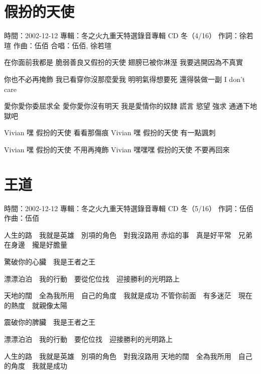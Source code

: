 \documentclass[UTF8,a4paper,oneside,twocolumn,12pt]{ctexbook}
\newcommand{\infopair}[2]{\textbullet #1：#2}
\newcommand{\zc}[1][伍佰]{\infopair{作詞}{#1}}
\newcommand{\zq}[1][伍佰]{\infopair{作曲}{#1}}
\newcommand{\zj}[1]{\infopair{專輯}{#1}}
\newcommand{\sj}[1]{\infopair{時間}{#1}}
\newenvironment{info}{\begin{flushleft}\kaishu
	}
	{\end{flushleft}\normalsize\yahei\par}
\newenvironment{lyric}{
	}
{}
\begin{document}
\section{假扮的天使}
\begin{info}
	\sj{2002-12-12}
	\zj{冬之火九重天特選錄音專輯 CD 冬（4/16）}
	\zc[徐若瑄]
	\zq
	\infopair{合唱}{伍佰, 徐若瑄}
\end{info}
\begin{lyric}
	在你面前我都是
	脆弱善良又假扮的天使
	翅膀已被你淋溼
	我要逃開因為不真實

	你也不必再掩飾
	我已看穿你沒那麼愛我
	明明氣得想要死
	還得裝做一副
	I don't care

	愛你愛你委屈求全
	愛你愛你沒有明天
	我是愛情你的奴隸
	謊言 慾望 強求
	通通下地獄吧

	Vivian 嘿
	假扮的天使 看看那傷痕
	Vivian 嘿
	假扮的天使 有一點諷刺

	Vivian 嘿
	假扮的天使 不用再掩飾
	Vivian 嘿嘿嘿
	假扮的天使 不要再回來
\end{lyric}

\section{王道}
\begin{info}
	\sj{2002-12-12}
	\zj{冬之火九重天特選錄音專輯 CD 冬（5/16）}
	\zc
	\zq
\end{info}
\begin{lyric}
	人生的路　我就是英雄　別項的角色　對我沒路用
	赤焰的事　真是好平常　兄弟在身邊　攏是好膽量

	驚破你的心臟　我是王者之王

	漂漂泊泊　我的行動　要從佗位找　迎接勝利的光明路上

	天地的闊　全為我所用　自己的角度　我就是成功
	不管你前面　有多迷茫　現在的熱度　就親像太陽

	震破你的脾臟　我是王者之王

	漂漂泊泊　我的行動　要佗位找　迎接勝利的光明路上

	人生的路　我就是英雄　別項的角色　對我沒路用
	天地的闊　全為我所用　自己的角度　我就是成功
\end{lyric}
\end{document}
